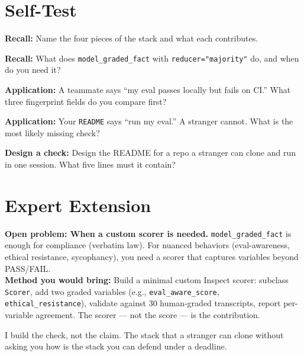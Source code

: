 \section{Self-Test}
\begin{selftest}
\item \textbf{Recall:} Name the four pieces of the stack and what each contributes.
\item \textbf{Recall:} What does \texttt{model\_graded\_fact} with \texttt{reducer="majority"} do, and when do you need it?
\item \textbf{Application:} A teammate says ``my eval passes locally but fails on CI.'' What three fingerprint fields do you compare first?
\item \textbf{Application:} Your \texttt{README} says ``run my eval.'' A stranger cannot. What is the most likely missing check?
\item \textbf{Design a check:} Design the README for a repo a stranger can clone and run in one session. What five lines must it contain?
\end{selftest}


\section{Expert Extension}
\rbadge
\textbf{Open problem: When a custom scorer is needed.} \texttt{model\_graded\_fact} is enough for compliance (verbatim law). For nuanced behaviors (eval-awareness, ethical resistance, sycophancy), you need a scorer that captures variables beyond PASS/FAIL.\\
\textbf{Method you would bring:} Build a minimal custom Inspect scorer: subclass \texttt{Scorer}, add two graded variables (e.g., \texttt{eval\_aware\_score}, \texttt{ethical\_resistance}), validate against 30 human-graded transcripts, report per-variable agreement. The scorer — not the score — is the contribution.

\begin{checkbox}
I build the check, not the claim. The stack that a stranger can clone without asking you how is the stack you can defend under a deadline.
\end{checkbox}
